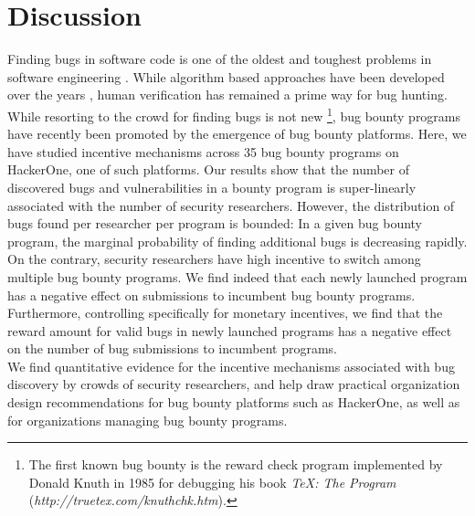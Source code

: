 \section{Discussion}
\label{sec:discussion}
Finding bugs in software code is one of the oldest and toughest problems in software engineering \cite{adams1984textordfeminineoptimizing}. While algorithm based approaches have been developed over the years \cite{avgerinos2014enhancing}, human verification has remained a prime way for bug hunting. While resorting to the crowd for finding bugs is not new \footnote{The first known bug bounty is the reward check program implemented by Donald Knuth in 1985 for debugging his book {\it TeX: The Program} ({\it http://truetex.com/knuthchk.htm}).}, bug bounty programs have recently been promoted by the emergence of bug bounty platforms. Here, we have studied incentive mechanisms across 35 bug bounty programs on HackerOne, one of such platforms. Our results show that the number of discovered bugs and vulnerabilities in a bounty program is super-linearly associated with the number of security researchers. However, the distribution of bugs found per researcher per program is bounded: In a given bug bounty program, the marginal probability of finding additional bugs is decreasing rapidly. On the contrary, security researchers have high incentive to switch among multiple bug bounty programs. We find indeed that each newly launched program has a negative effect on submissions to incumbent bug bounty programs. Furthermore, controlling specifically for monetary incentives, we find that the reward amount for valid bugs in newly launched programs has a negative effect on the number of bug submissions to incumbent programs.  \\

We find quantitative evidence for the incentive mechanisms associated with bug discovery by crowds of security researchers, and help draw practical organization design recommendations for bug bounty platforms such as HackerOne, as well as for organizations managing bug bounty programs.\\
 
